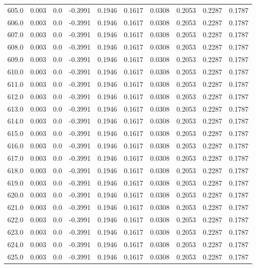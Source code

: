 \begin{longtable}{lrrrrrrrrr}
605.0 & 0.003 & 0.0 & -0.3991 & 0.1946 & 0.1617 & 0.0308 & 0.2053 & 0.2287 & 0.1787 \\
606.0 & 0.003 & 0.0 & -0.3991 & 0.1946 & 0.1617 & 0.0308 & 0.2053 & 0.2287 & 0.1787 \\
607.0 & 0.003 & 0.0 & -0.3991 & 0.1946 & 0.1617 & 0.0308 & 0.2053 & 0.2287 & 0.1787 \\
608.0 & 0.003 & 0.0 & -0.3991 & 0.1946 & 0.1617 & 0.0308 & 0.2053 & 0.2287 & 0.1787 \\
609.0 & 0.003 & 0.0 & -0.3991 & 0.1946 & 0.1617 & 0.0308 & 0.2053 & 0.2287 & 0.1787 \\
610.0 & 0.003 & 0.0 & -0.3991 & 0.1946 & 0.1617 & 0.0308 & 0.2053 & 0.2287 & 0.1787 \\
611.0 & 0.003 & 0.0 & -0.3991 & 0.1946 & 0.1617 & 0.0308 & 0.2053 & 0.2287 & 0.1787 \\
612.0 & 0.003 & 0.0 & -0.3991 & 0.1946 & 0.1617 & 0.0308 & 0.2053 & 0.2287 & 0.1787 \\
613.0 & 0.003 & 0.0 & -0.3991 & 0.1946 & 0.1617 & 0.0308 & 0.2053 & 0.2287 & 0.1787 \\
614.0 & 0.003 & 0.0 & -0.3991 & 0.1946 & 0.1617 & 0.0308 & 0.2053 & 0.2287 & 0.1787 \\
615.0 & 0.003 & 0.0 & -0.3991 & 0.1946 & 0.1617 & 0.0308 & 0.2053 & 0.2287 & 0.1787 \\
616.0 & 0.003 & 0.0 & -0.3991 & 0.1946 & 0.1617 & 0.0308 & 0.2053 & 0.2287 & 0.1787 \\
617.0 & 0.003 & 0.0 & -0.3991 & 0.1946 & 0.1617 & 0.0308 & 0.2053 & 0.2287 & 0.1787 \\
618.0 & 0.003 & 0.0 & -0.3991 & 0.1946 & 0.1617 & 0.0308 & 0.2053 & 0.2287 & 0.1787 \\
619.0 & 0.003 & 0.0 & -0.3991 & 0.1946 & 0.1617 & 0.0308 & 0.2053 & 0.2287 & 0.1787 \\
620.0 & 0.003 & 0.0 & -0.3991 & 0.1946 & 0.1617 & 0.0308 & 0.2053 & 0.2287 & 0.1787 \\
621.0 & 0.003 & 0.0 & -0.3991 & 0.1946 & 0.1617 & 0.0308 & 0.2053 & 0.2287 & 0.1787 \\
622.0 & 0.003 & 0.0 & -0.3991 & 0.1946 & 0.1617 & 0.0308 & 0.2053 & 0.2287 & 0.1787 \\
623.0 & 0.003 & 0.0 & -0.3991 & 0.1946 & 0.1617 & 0.0308 & 0.2053 & 0.2287 & 0.1787 \\
624.0 & 0.003 & 0.0 & -0.3991 & 0.1946 & 0.1617 & 0.0308 & 0.2053 & 0.2287 & 0.1787 \\
625.0 & 0.003 & 0.0 & -0.3991 & 0.1946 & 0.1617 & 0.0308 & 0.2053 & 0.2287 & 0.1787 \\

\end{longtable}
